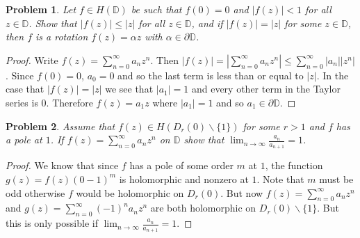 \documentclass{article}
\newtheorem{problem}{Problem}
\begin{document}
\begin{problem}
Let $f \in H(\mathbb{D})$ be such that $f(0) = 0$ and $|f(z)| < 1$ for all $z \in \mathbb{D}$. Show that $|f(z)| \leq |z|$ for all $z \in \mathbb{D}$, and if $|f(z)| = |z|$ for some $z \in \mathbb{D}$, then $f$ is a rotation $f(z) = \alpha z$ with $\alpha \in \partial \mathbb{D}$.
\end{problem}
\begin{proof}
Write $f(z) = \sum_{n=0}^{\infty} a_n z^n$. Then $|f(z)| = \left | \sum_{n=0}^{\infty} a_n z^n \right | \leq \sum_{n=0}^{\infty} |a_n| |z^n|$. Since $f(0) = 0$, $a_0 = 0$ and so the last term is less than or equal to $|z|$. In the case that $|f(z)| = |z|$ we see that $|a_1| = 1$ and every other term in the Taylor series is $0$. Therefore $f(z) = a_1 z$ where $|a_1| = 1$ and so $a_1 \in \partial \mathbb{D}$.
\end{proof}

\begin{problem}
Assume that $f(z) \in H(D_r(0) \backslash \{1\})$ for some $r > 1$ and $f$ has a pole at $1$. If $f(z) = \sum_{n=0}^{\infty} a_n z^n$ on $\mathbb{D}$ show that $\lim_{n \rightarrow \infty} \frac{a_n}{a_{n+1}} = 1$.
\end{problem}
\begin{proof}
We know that since $f$ has a pole of some order $m$ at $1$, the function $g(z) = f(z)(0-1)^m$ is holomorphic and nonzero at $1$. Note that $m$ must be odd otherwise $f$ would be holomorphic on $D_r(0)$. But now $f(z) = \sum_{n=0}^{\infty} a_n z^n$ and $g(z) = \sum_{n=0}^{\infty} (-1)^n a_n z^n$ are both holomorphic on $D_r(0) \backslash \{1\}$. But this is only possible if $\lim_{n \rightarrow \infty}\frac{a_n}{a_{n+1}} = 1$.
\end{proof}
\end{document}

